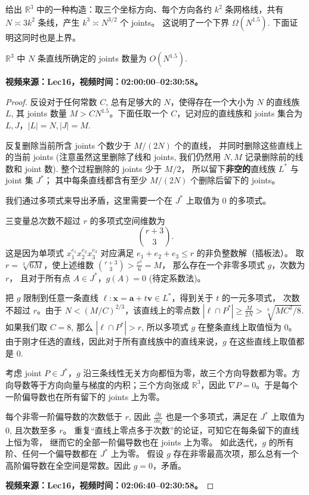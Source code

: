 给出 $\mathbb{R}^3$ 中的一种构造：取三个坐标方向、每个方向各约 $k^2$ 条网格线，共有 $N\asymp3k^2$ 条线，产生 $k^3\asymp N^{3/2}$ 个 joints。
这说明了一个下界 \(\Omega(N^{1.5}).\) 下面证明这同时也是上界。

\begin{theorem}
$\mathbb{R}^3$ 中 $N$ 条直线所确定的 joints 数量为 \(O(N^{1.5}).\)

\ifdefined\VideoNotesTestMode
\textbf{视频来源：Lec16，视频时间：02:00:00--02:30:58。}
\fi
\end{theorem}

\begin{proof}
反设对于任何常数 $C$, 总有足够大的 $N$，使得存在一个大小为 $N$ 的直线族 $L$, 
其 joints 数量 $M>CN^{1.5}$。下面任取一个 $C$，记对应的直线族和 joints 集合为 $L,J$，$|L|=N,|J|=M$.

反复删除当前所含 joints 个数少于 $M/(2N)$ 个的直线，
并同时删除这些直线上的当前 joints 
(注意虽然这里删除了线和 joints, 我们仍然用 $N,M$ 记录删除前的线数和 joint 数).
整个过程删除的 joints 少于 $M/2$，
所以留下\textbf{非空的}直线族 $L^*$ 与 joint 集 $J^*$；
其中每条直线都含有至少 $M/(2N)$ 个删除后留下的 joints。

我们通过多项式来导出矛盾，这里需要一个在 $J^*$ 上取值为 $0$ 的多项式。

三变量总次数不超过 $r$ 的多项式空间维数为
\[
\binom{r+3}{3}.
\]
这是因为单项式 $x_1^{e_1}x_2^{e_2}x_3^{e_3}$ 对应满足
$e_1+e_2+e_3\leq r$ 的非负整数解（插板法）。
取 $r=\sqrt[3]{6M}$，使上述维数 $\binom{r+3}{3}>\frac{r^3}{6}=M$，
那么存在一个非零多项式 $g$，次数为 $r$，
且对于所有点 $A\in J^*$，$g(A)=0$ (待定系数法)。

把 $g$ 限制到任意一条直线 $\ell:\mathbf x=\mathbf a+t\mathbf v\in L^*$，得到关于 $t$ 的一元多项式，
次数不超过 $r$。由于 $N<(M/C)^{2/3}$，该直线上的零点数 
$|\ell\cap P^*|\geq \frac{M}{2N}>\sqrt[3]{MC^2/8}$. 
如果我们取 $C=8$, 那么 $|\ell\cap P^*|>r$, 所以多项式 $g$ 在整条直线上取值恒为 $0$。
由于刚才任选的直线，因此对于所有直线族中的直线来说，$g$ 在这些直线上取值都是 $0$.

考虑 joint $P\in J^*$，$g$ 沿三条线性无关方向都恒为零，故三个方向导数都为零。方向导数等于方向向量与梯度的内积；三个方向张成 $\mathbb{R}^3$，因此 $\nabla P=0$。于是每个一阶偏导数也在所有留下的 joints 上为零。

每个非零一阶偏导数的次数低于 $r$, 因此 $\frac{\partial g}{\partial x_i}$ 也是一个多项式，满足在 $J^*$ 上取值为 $0$, 且次数至多 $r$。
重复“直线上零点多于次数”的论证，可知它在每条留下的直线上恒为零，
继而它的全部一阶偏导数也在 joints 上为零。
如此迭代，$g$ 的所有阶、任何一个偏导数都在 $J^*$ 上为零。
假设 $g$ 存在非零最高次项，那么总有一个高阶偏导数在全空间是常数。因此 $g=0$，矛盾。

\ifdefined\VideoNotesTestMode
\textbf{视频来源：Lec16，视频时间：02:06:40--02:30:58。}
\fi
\end{proof}

